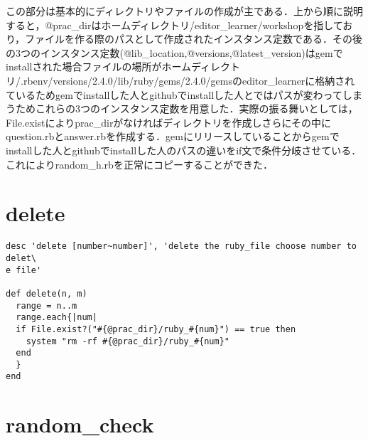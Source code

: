 この部分は基本的にディレクトリやファイルの作成が主である．上から順に説明すると，@prac\_dirはホームディレクトリ/editor\_learner/workshopを指しており，ファイルを作る際のパスとして作成されたインスタンス定数である．その後の3つのインスタンス定数(@lib\_location,@versions,@latest\_version)はgemでinstallされた場合ファイルの場所がホームディレクトリ/.rbenv/versions/2.4.0/lib/ruby/gems/2.4.0/gemsのeditor\_learnerに格納されているためgemでinstallした人とgithubでinstallした人とではパスが変わってしまうためこれらの3つのインスタンス定数を用意した．実際の振る舞いとしては，File.existによりprac\_dirがなければディレクトリを作成しさらにその中にquestion.rbとanswer.rbを作成する．gemにリリースしていることからgemでinstallした人とgithubでinstallした人のパスの違いをif文で条件分岐させている．これによりrandom\_h.rbを正常にコピーすることができた．

    \section{delete}\label{delete}

\begin{verbatim}
desc 'delete [number~number]', 'delete the ruby_file choose number to delet\
e file'

def delete(n, m)
  range = n..m
  range.each{|num|
  if File.exist?("#{@prac_dir}/ruby_#{num}") == true then
    system "rm -rf #{@prac_dir}/ruby_#{num}"
  end
  }
end
\end{verbatim}

    \section{random\_check}\label{random_check}

